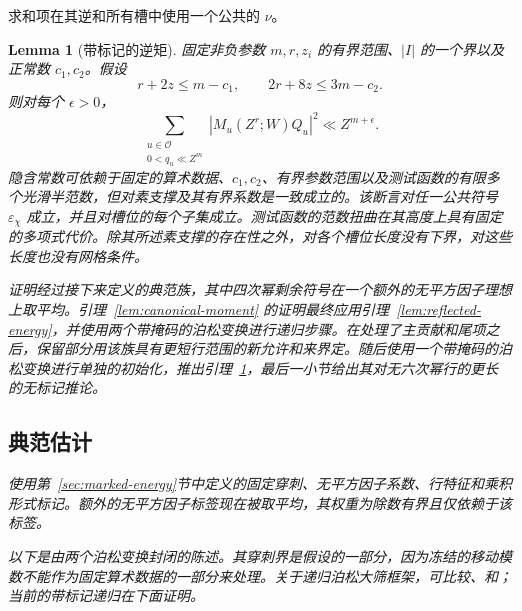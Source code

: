 \documentclass[11pt,a4paper]{article}
\numberwithin{equation}{section}
\numberwithin{figure}{section}
\newtheorem{lemma}[theorem]{Lemma}
\theoremstyle{definition}
\theoremstyle{remark}
\begin{document}
求和项在其逆和所有槽中使用一个公共的 \(\nu\)。\begin{lemma}[带标记的逆矩]\label{lem:marked}
固定非负参数 \(m,r,z_i\) 的有界范围、\(|I|\) 的一个界以及正常数 \(c_1,c_2\)。假设
\[
 r+2z\le m-c_1,\qquad 2r+8z\le3m-c_2.
\]
则对每个 \(\epsilon>0\)，
\begin{equation}\label{old-eq:4.1}
 \sum_{\substack{u\in\mathcal O\\0<q_u\ll Z^m}}
       |M_u(Z^r;W)Q_u|^2\ll Z^{m+\epsilon}.
\end{equation}
隐含常数可依赖于固定的算术数据、\(c_1,c_2\)、有界参数范围以及测试函数的有限多个光滑半范数，但对素支撑及其有界系数是一致成立的。该断言对任一公共符号 \(\varepsilon_\chi\) 成立，并且对槽位的每个子集成立。测试函数的范数扭曲在其高度上具有固定的多项式代价。除其所述素支撑的存在性之外，对各个槽位长度没有下界，对这些长度也没有网格条件。

证明经过接下来定义的典范族，其中四次幂剩余符号在一个额外的无平方因子理想上取平均。引理~\ref{lem:canonical-moment} 的证明最终应用引理~\ref{lem:reflected-energy}，并使用两个带掩码的泊松变换进行递归步骤。在处理了主贡献和尾项之后，保留部分用该族具有更短行范围的新允许和来界定。随后使用一个带掩码的泊松变换进行单独的初始化，推出引理~\ref{lem:marked}，最后一小节给出其对无六次幂行的更长的无标记推论。

\subsection{典范估计}

使用第~\ref{sec:marked-energy}节中定义的固定穿刺、无平方因子系数、行特征和乘积形式标记。额外的无平方因子标签现在被取平均，其权重为除数有界且仅依赖于该标签。

以下是由两个泊松变换封闭的陈述。其穿刺界是假设的一部分，因为冻结的移动模数不能作为固定算术数据的一部分来处理。关于递归泊松大筛框架，可比较\cite[第~2节]{HBQuadratic}、\cite[第~4节]{HB}和\cite[第~4--7节]{GL}；当前的带标记递归在下面证明。


\end{lemma}
\end{document}
